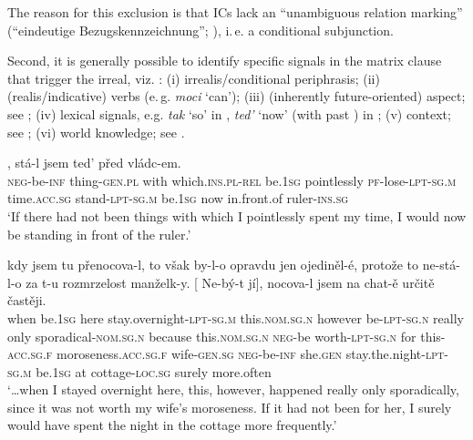 \documentclass[output=paper,colorlinks,citecolor=brown,newtxmath]{langsci/langscibook}
\begin{document}
\noindent The reason for this exclusion is that ICs lack an ``unambiguous relation marking'' (``eindeutige Bezugskennzeichnung''; \citealt[135]{Reis1997}), i.\,e. a conditional subjunction.

Second, it is generally possible to identify specific signals in the matrix clause that trigger the irreal, viz. : (i) irrealis/conditional periphrasis; (ii) (realis/indicative)  verbs (e.\,g. \textit{moci} `can'); (iii) (inherently future-oriented)  aspect; see ; (iv) lexical signals, e.g. \textit{tak} `so' in , \textit{ted'} `now' (with past ) in ; (v) context; see ; (vi) world knowledge; see .

\ea\label{ex:ruler}
, stá-l jsem ted' před vládc-em. \\
	{} \textsc{neg}-be-\textsc{inf} thing-\textsc{gen.pl} with which.\textsc{ins.pl}-\textsc{rel} be.\textsc{1sg} pointlessly \textsc{pf}-lose-\textsc{lpt-sg.m} time.\textsc{acc.sg} stand-\textsc{lpt-sg.m} be.\textsc{1sg} now {in.front.of} ruler-\textsc{ins.sg} \\
\glt `If there had not been things with which I pointlessly spent my time, I would now be standing in front of the ruler.’ \hfill \citep[;][5]{Milotova2012}
\z

\ea\label{ex:kontext}
\gll {\ldots}\hspace{-2pt} kdy jsem tu přenocova-l, to však by-l-o opravdu jen ojediněl-é, protože to ne-stá-l-o za t-u rozmrzelost manželk-y. [\hspace{-2pt} Ne-bý-t jí], nocova-l jsem na chat-ě určitě častěji.\\
	{} when be.\textsc{1sg} here {stay.overnight}-\textsc{lpt-sg.m} this.\textsc{nom.sg.n} however be-\textsc{lpt-sg.n} really only sporadical-\textsc{nom.sg.n} because this.\textsc{nom.sg.n} \textsc{neg}-{be worth}-\textsc{lpt-sg.n} for this-\textsc{acc.sg.f} moroseness.\textsc{acc.sg.f} wife-\textsc{gen.sg} {} \textsc{neg}-be-\textsc{inf} she.\textsc{gen} {stay.the.night}-\textsc{lpt-sg.m} be.\textsc{1sg} at cottage-\textsc{loc.sg} surely more.often \\
\glt `\ldots when I stayed overnight here, this, however, happened really only sporadically, since it was not worth my wife's moroseness. If it had not been for her, I surely would have spent the night in the cottage more frequently.' \hfill \citep[;][5]{Milotova2012}
\z
\end{document}
